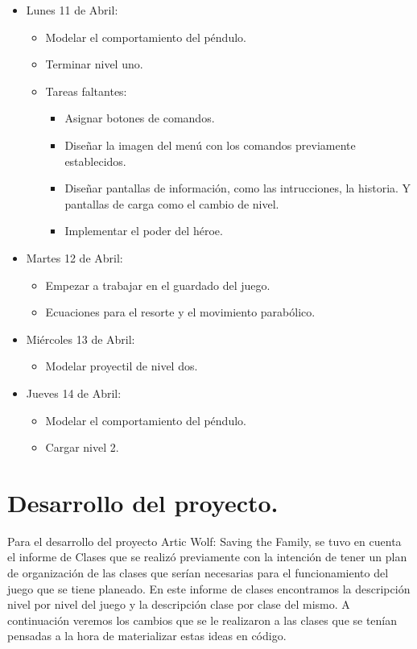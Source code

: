 \documentclass{article}
\begin{document}
\begin{itemize}
    \item Lunes 11 de Abril:
    \begin{itemize}
        \item Modelar el comportamiento del péndulo.
        \item Terminar nivel uno.
        
        \item Tareas faltantes:
        \begin{itemize}
            \item Asignar botones de comandos.
            \item Diseñar la imagen del menú con los comandos previamente establecidos.
            \item Diseñar pantallas de información, como las intrucciones, la historia. Y pantallas de carga como el cambio de nivel.
            \item Implementar el poder del héroe.
        \end{itemize}
    \end{itemize}
    
    \item Martes 12 de Abril:
    \begin{itemize}
        \item Empezar a trabajar en el guardado del juego.
        \item Ecuaciones para el resorte y el movimiento parabólico.
    \end{itemize}
    
    \item Miércoles 13 de Abril:
    \begin{itemize}
        \item Modelar proyectil de nivel dos.
    \end{itemize}
    
    \item Jueves 14 de Abril:
    \begin{itemize}
        \item Modelar el comportamiento del péndulo.
        \item Cargar nivel 2.
    \end{itemize}
    
    
\end{itemize}

\section{Desarrollo del proyecto.}
Para el desarrollo del proyecto Artic Wolf: Saving the Family, se tuvo en cuenta el informe de Clases que se realizó previamente con la intención de tener un plan de organización de las clases que serían necesarias para el funcionamiento del juego que se tiene planeado. En este informe de clases encontramos la descripción nivel por nivel del juego y la descripción clase por clase del mismo. A continuación veremos los cambios que se le realizaron a las clases que se tenían pensadas a la hora de materializar estas ideas en código.
\end{document}
